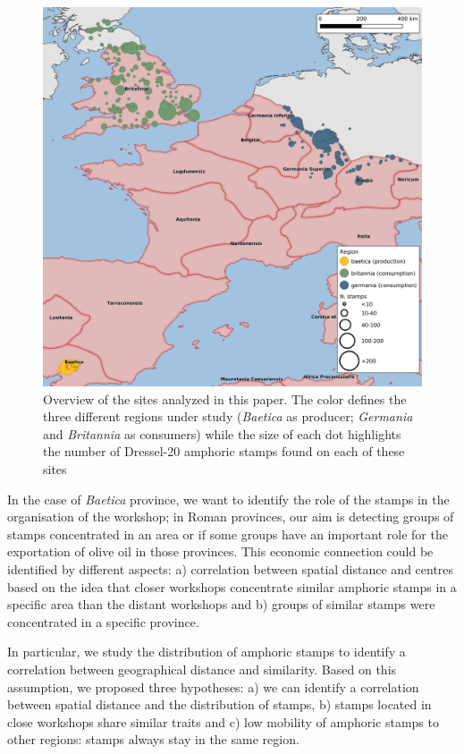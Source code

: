 \documentclass[review]{elsarticle}
\begin{document}
\begin{figure}[htp]
	\centering
\includegraphics[width=\linewidth]{figs/general_map}
\caption{Overview of the sites analyzed in this paper. The color defines the three different regions under study (\textit{Baetica} as producer; \textit{Germania} and \textit{Britannia} as consumers) while the size of each dot highlights the number of Dressel-20 amphoric stamps found on each of these sites}

\label{general}
\end{figure} 
        
In the case of \textit{Baetica} province, we want to identify the role of the stamps in the organisation of the workshop; in Roman provinces, our aim is detecting groups of stamps concentrated in an area or if some groups have an important role for the exportation of olive oil in those provinces. This economic connection could be identified by different aspects: a) correlation between spatial distance and centres based on the idea that closer workshops concentrate similar amphoric stamps in a specific area than the distant workshops and b) groups of similar stamps were concentrated in a specific province. 

In particular, we study the distribution of amphoric stamps to identify a correlation between geographical distance and similarity. Based on this assumption, we proposed three hypotheses: a) we can identify a correlation between spatial distance and the distribution of stamps, b) stamps located in close workshops share similar traits and c) low mobility of amphoric stamps to other regions: stamps always stay in the same region. 
\end{document}
